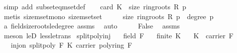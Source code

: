 \begin{isabellebody}
\ {\isacharparenleft}{\kern0pt}simp\ add{\isacharcolon}{\kern0pt}\ subseteq{\isacharunderscore}{\kern0pt}mset{\isacharunderscore}{\kern0pt}def{\isacharparenright}{\kern0pt}\isanewline
\ \ \isamarkupfalse%
\ {\isachardoublequoteopen}card\ K\ {\isasymle}\ size\ {\isacharparenleft}{\kern0pt}ring{\isachardot}{\kern0pt}roots\ R\ p{\isacharparenright}{\kern0pt}{\isachardoublequoteclose}\ \isanewline
\ \ \ \ \isamarkupfalse%
\ {\isacharparenleft}{\kern0pt}metis\ size{\isacharunderscore}{\kern0pt}mset{\isacharunderscore}{\kern0pt}mono\ size{\isacharunderscore}{\kern0pt}mset{\isacharunderscore}{\kern0pt}set{\isacharparenright}{\kern0pt}\isanewline
\ \ \isamarkupfalse%
\ \isamarkupfalse%
\ {\isachardoublequoteopen}size\ {\isacharparenleft}{\kern0pt}ring{\isachardot}{\kern0pt}roots\ R\ p{\isacharparenright}{\kern0pt}\ {\isasymle}\ degree\ p{\isachardoublequoteclose}\isanewline
\ \ \ \ \isamarkupfalse%
\ a\ field{\isachardot}{\kern0pt}size{\isacharunderscore}{\kern0pt}roots{\isacharunderscore}{\kern0pt}le{\isacharunderscore}{\kern0pt}degree\ assms\ \isamarkupfalse%
\ auto\isanewline
\ \ \isamarkupfalse%
\ \isamarkupfalse%
\ {\isachardoublequoteopen}False{\isachardoublequoteclose}\ \isamarkupfalse%
\ assms{\isacharparenleft}{\kern0pt}{}{\isacharparenright}{\kern0pt}\ \isanewline
\ \ \ \ \isamarkupfalse%
\ {\isacharparenleft}{\kern0pt}meson\ leD\ less{\isacharunderscore}{\kern0pt}le{\isacharunderscore}{\kern0pt}trans{\isacharparenright}{\kern0pt}\isanewline
{}\isamarkupfalse%
%
\endisatagproof
{\isafoldproof}%
%
\isadelimproof
\isanewline
%
\endisadelimproof
\isanewline
{}\isamarkupfalse%
\ split{\isacharunderscore}{\kern0pt}poly{\isacharunderscore}{\kern0pt}inj{\isacharcolon}{\kern0pt}\isanewline
\ \ \ {\isachardoublequoteopen}field\ F{\isachardoublequoteclose}\isanewline
\ \ \ {\isachardoublequoteopen}finite\ K{\isachardoublequoteclose}\isanewline
\ \ \ {\isachardoublequoteopen}K\ {\isasymsubseteq}\ carrier\ F{\isachardoublequoteclose}\isanewline
\ \ \ {\isachardoublequoteopen}inj{\isacharunderscore}{\kern0pt}on\ {\isacharparenleft}{\kern0pt}split{\isacharunderscore}{\kern0pt}poly\ F\ K{\isacharparenright}{\kern0pt}\ {\isacharparenleft}{\kern0pt}carrier\ {\isacharparenleft}{\kern0pt}poly{\isacharunderscore}{\kern0pt}ring\ F{\isacharparenright}{\kern0pt}{\isacharparenright}{\kern0pt}{\isachardoublequoteclose}\isanewline

\end{isabellebody}

